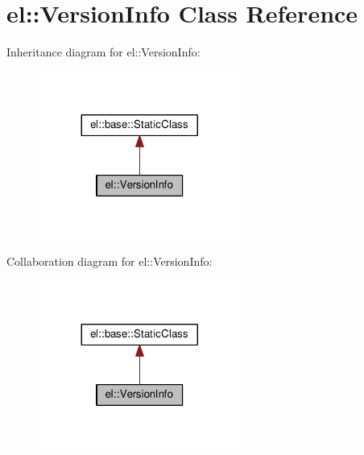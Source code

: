 \hypertarget{classel_1_1_version_info}{}\section{el\+:\+:Version\+Info Class Reference}
\label{classel_1_1_version_info}


Inheritance diagram for el\+:\+:Version\+Info\+:
\nopagebreak
\begin{figure}[H]
\begin{center}
\leavevmode
\includegraphics[width=188pt]{classel_1_1_version_info__inherit__graph}
\end{center}
\end{figure}


Collaboration diagram for el\+:\+:Version\+Info\+:
\nopagebreak
\begin{figure}[H]
\begin{center}
\leavevmode
\includegraphics[width=188pt]{classel_1_1_version_info__coll__graph}
\end{center}
\end{figure}

